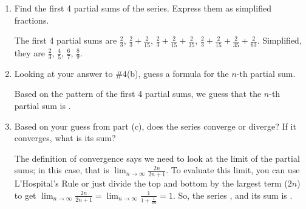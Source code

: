 \documentclass[main]{subfiles}
\begin{document}
\begin{enumerate}
\begin{enumerate}
    \begin{solution}
    $\frac{2}{3}$, $\frac{2}{15}$, $\frac{2}{35}$, $\frac{2}{63}$.
    \end{solution}

    \item
    \begin{problem}[\vfill]
    Find the first 4 partial sums of the series.  Express them as
    simplified fractions.
    \end{problem}

    \begin{solution}
    The first 4 partial sums are $\frac{2}{3}$, $\frac{2}{3} +
    \frac{2}{15}$, $\frac{2}{3} + \frac{2}{15} + \frac{2}{35}$,
    $\frac{2}{3} + \frac{2}{15} + \frac{2}{35} + \frac{2}{63}$.
    Simplified, they are $\frac{2}{3}$, $\frac{4}{5}$, $\frac{6}{7}$,
    $\frac{8}{9}$.  
    \end{solution}

    \item
    \begin{problem}[\vfill]
    Looking at your answer to {{\#4}(b)},
    guess a formula for the $n$-th partial sum.
    \end{problem}

    \begin{solution}
    Based on the pattern of the first 4 partial sums, we guess that the
    $n$-th partial sum is .
    \end{solution}
    
    \item
    \begin{problem}[\vfill]
    Based on your guess from part (c), does the series converge or
    diverge?  If it converges, what is its sum?
    \end{problem}

    \begin{solution}
    The definition of convergence says we need to look at the limit of
    the partial sums; in this case, that is $\displaystyle \lim_{n \to
    \infty} \frac{2n}{2n + 1}$.  To evaluate this limit, you can use
    L'Hospital's Rule or just divide the top and bottom by the largest
    term ($2n$) to get $\displaystyle \lim_{n \to \infty} \frac{2n}{2n +
    1} = \lim_{n \to \infty} \frac{1}{1 + \frac{1}{2n}} = 1$.  So, the
    series , and its sum is .
    \end{solution}
  \end{enumerate}
  

\end{enumerate}
\end{document}
